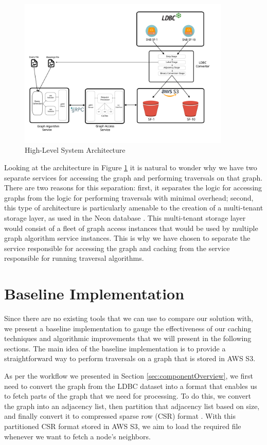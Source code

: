 \begin{figure}[ht]
    \centering
    \includegraphics[width=0.9\textwidth]{figures/architecture.png}
    \caption{High-Level System Architecture}
    \label{fig:sysArch}
\end{figure}

Looking at the architecture in Figure \ref{fig:sysArch} it is natural to wonder
why we have two separate services for accessing the graph and performing
traversals on that graph. There are two reasons for this separation: first, it
separates the logic for accessing graphs from the logic for performing
traversals with minimal overhead; second, this type of architecture is
particularly amenable to the creation of a multi-tenant storage layer, as used
in the Neon database \cite{neonPostgres}. This multi-tenant storage layer would
consist of a fleet of graph access instances that would be used by multiple
graph algorithm service instances. This is why we have chosen to separate
the service responsible for accessing the graph and caching from the service
responsible for running traversal algorithms.

\section{Baseline Implementation}\label{sec:baseline}
Since there are no existing tools that we can use to compare our solution with,
we present a baseline implementation to gauge the effectiveness of our caching
techniques and algorithmic improvements that we will present in the following
sections. The main idea of the baseline implementation is to provide a
straightforward way to perform traversals on a graph that is stored in AWS S3.

\medskip
As per the workflow we presented in Section \ref{sec:componentOverview}, we
first need to convert the graph from the LDBC dataset into a format that
enables us to fetch parts of the graph that we need for processing. To
do this, we convert the graph into an adjacency list, then partition that
adjacency list based on size, and finally convert it to compressed sparse
row (CSR) format \cite{duff1984computer}. With this partitioned CSR format stored
in AWS S3, we aim to load the required file whenever we want to fetch a node's
neighbors.

